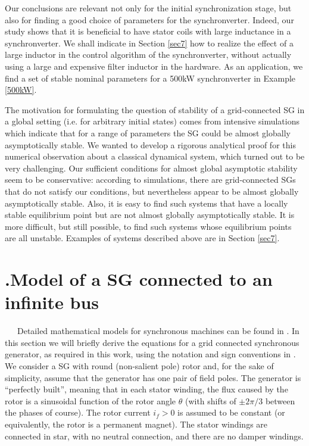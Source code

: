 \documentclass[12pt]{article}
\theoremstyle{definition}
\numberwithin{equation}{section}                        %
\newcommand{\secp}{{\hbox{\hskip -7mm.\hskip 4mm}}}
\let\oldlabel=\label
\renewcommand{\label}[1]{\leavevmode\smash{\raise 10pt\llap
             {\fbox{\scriptsize#1}}}\oldlabel{#1}}
\renewcommand{\label}[1]{\oldlabel{#1}}
\begin{document}
Our conclusions are relevant not only for the initial synchronization
stage, but also for finding a good choice of parameters for the
synchronverter. Indeed, our study shows that it is beneficial to have
stator coils with large inductance in a synchronverter. We shall
indicate in Section \ref{sec7} how to realize the effect of a
large inductor in the control algorithm of the synchronverter, without
actually using a large and expensive filter inductor in the hardware.
As an application, we find a set of stable nominal parameters for a
500kW synchronverter in Example \ref{500kW}.

The motivation for formulating the question of stability of a
grid-connected SG in a global setting (i.e. for arbitrary initial
states) comes from intensive simulations which indicate that for a range
of parameters the SG could be almost globally asymptotically stable.
We wanted to develop a rigorous analytical proof for this numerical
observation about a classical dynamical system, which turned out to be
very challenging. Our sufficient conditions for almost global asymptotic
stability seem to be conservative: according to simulations, there are
grid-connected SGs that do not satisfy our conditions, but nevertheless
appear to be almost globally asymptotically stable. Also, it is easy to
find such systems that have a locally stable equilibrium point but are
not almost globally asymptotically stable. It is more difficult, but
still possible, to find such systems whose equilibrium points are all
unstable. Examples of systems described above are in Section \ref{sec7}.


\section{\secp Model of a SG connected to an infinite bus}
\label{sec2} %

\ \ \ Detailed mathematical models for synchronous machines can be
found in \cite{Fitzgerald:03,GrSt:94,KoNa:04,Kun:94,Walker:94}. In
this section we will briefly derive the equations for a grid connected
synchronous generator, as required in this work, using the notation
and sign conventions in \cite{MaWe:15,ZhWe:11}. We consider a SG
with round (non-salient pole) rotor and, for the sake of simplicity,
assume that the generator has one pair of field poles. The generator
is ``perfectly built'', meaning that in each stator winding, the flux
caused by the rotor is a sinusoidal function of the rotor angle
$\theta$ (with shifts of $\pm 2\pi/3$ between the phases of course).
The rotor current $i_f>0$ is assumed to be constant (or equivalently,
the rotor is a permanent magnet). The stator windings are connected
in star, with no neutral connection, and there are no damper windings.
\end{document}

